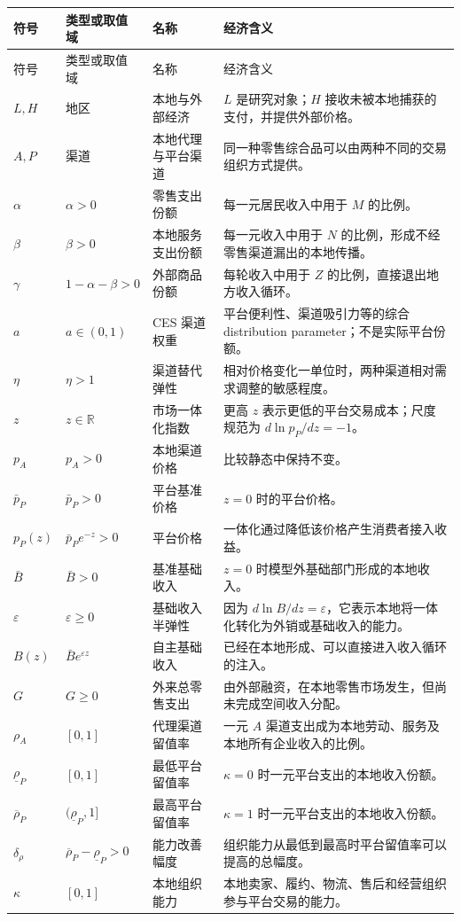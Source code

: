 \documentclass[UTF8,11pt,scheme=chinese,fontset=fandol]{ctexart}
\theoremstyle{definition}
\begin{document}
\small
\begin{longtable}{>{\centering\arraybackslash}p{1.8cm}
>{\raggedright\arraybackslash}p{2.5cm}
>{\raggedright\arraybackslash}p{3.1cm}
>{\raggedright\arraybackslash}p{7.2cm}}
\toprule
符号 & 类型或取值域 & 名称 & 经济含义 \\
\midrule
\endfirsthead
\toprule
符号 & 类型或取值域 & 名称 & 经济含义 \\
\midrule
\endhead
\(L,H\) & 地区 & 本地与外部经济 & \(L\) 是研究对象；\(H\) 接收未被本地捕获的支付，并提供外部价格。\\
\(A,P\) & 渠道 & 本地代理与平台渠道 & 同一种零售综合品可以由两种不同的交易组织方式提供。\\
\(\alpha\) & \(\alpha>0\) & 零售支出份额 & 每一元居民收入中用于 \(M\) 的比例。\\
\(\beta\) & \(\beta>0\) & 本地服务支出份额 & 每一元收入中用于 \(N\) 的比例，形成不经零售渠道漏出的本地传播。\\
\(\gamma\) & \(1-\alpha-\beta>0\) & 外部商品份额 & 每轮收入中用于 \(Z\) 的比例，直接退出地方收入循环。\\
\(a\) & \(a\in(0,1)\) & CES 渠道权重 & 平台便利性、渠道吸引力等的综合 distribution parameter；不是实际平台份额。\\
\(\eta\) & \(\eta>1\) & 渠道替代弹性 & 相对价格变化一单位时，两种渠道相对需求调整的敏感程度。\\
\(z\) & \(z\in\mathbb R\) & 市场一体化指数 & 更高 \(z\) 表示更低的平台交易成本；尺度规范为 \(d\ln p_P/dz=-1\)。\\
\(p_A\) & \(p_A>0\) & 本地渠道价格 & 比较静态中保持不变。\\
\(\bar p_P\) & \(\bar p_P>0\) & 平台基准价格 & \(z=0\) 时的平台价格。\\
\(p_P(z)\) & \(\bar p_Pe^{-z}>0\) & 平台价格 & 一体化通过降低该价格产生消费者接入收益。\\
\(\bar B\) & \(\bar B>0\) & 基准基础收入 & \(z=0\) 时模型外基础部门形成的本地收入。\\
\(\varepsilon\) & \(\varepsilon\geq0\) & 基础收入半弹性 & 因为 \(d\ln B/dz=\varepsilon\)，它表示本地将一体化转化为外销或基础收入的能力。\\
\(B(z)\) & \(\bar Be^{\varepsilon z}\) & 自主基础收入 & 已经在本地形成、可以直接进入收入循环的注入。\\
\(G\) & \(G\geq0\) & 外来总零售支出 & 由外部融资，在本地零售市场发生，但尚未完成空间收入分配。\\
\(\rho_A\) & \([0,1]\) & 代理渠道留值率 & 一元 \(A\) 渠道支出成为本地劳动、服务及本地所有企业收入的比例。\\
\(\underline\rho_P\) & \([0,1]\) & 最低平台留值率 & \(\kappa=0\) 时一元平台支出的本地收入份额。\\
\(\overline\rho_P\) & \((\underline\rho_P,1]\) & 最高平台留值率 & \(\kappa=1\) 时一元平台支出的本地收入份额。\\
\(\delta_\rho\) & \(\overline\rho_P-\underline\rho_P>0\) & 能力改善幅度 & 组织能力从最低到最高时平台留值率可以提高的总幅度。\\
\(\kappa\) & \([0,1]\) & 本地组织能力 & 本地卖家、履约、物流、售后和经营组织参与平台交易的能力。\\
\bottomrule
\end{longtable}
\normalsize
\end{document}
